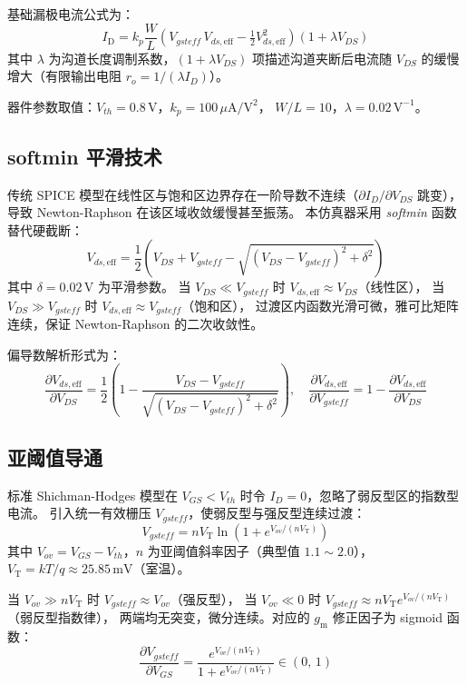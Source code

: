 \documentclass[12pt, a4paper]{article}
\newcommand{\id}{I_{\mathrm{D}}}
\newcommand{\gm}{g_{\mathrm{m}}}
\newcommand{\vT}{V_{\mathrm{T}}}
\begin{document}
基础漏极电流公式为：
\[
  \id = k_p \frac{W}{L}
        \left(V_{gsteff}\,V_{ds,\mathrm{eff}} - \tfrac{1}{2}V_{ds,\mathrm{eff}}^2\right)
        (1 + \lambda V_{DS})
\]
其中 $\lambda$ 为沟道长度调制系数，$(1+\lambda V_{DS})$ 项描述沟道夹断后电流随
$V_{DS}$ 的缓慢增大（有限输出电阻 $r_o = 1/(\lambda I_D)$）。

器件参数取值：$V_{th}=0.8\,\mathrm{V}$，$k_p=100\,\mu\mathrm{A/V^2}$，
$W/L=10$，$\lambda=0.02\,\mathrm{V^{-1}}$。

\subsection{softmin 平滑技术}
\label{sec:softmin}

传统 SPICE 模型在线性区与饱和区边界存在一阶导数不连续（$\partial I_D/\partial V_{DS}$ 跳变），
导致 Newton-Raphson 在该区域收敛缓慢甚至振荡。
本仿真器采用 \textit{softmin} 函数替代硬截断：
\[
  V_{ds,\mathrm{eff}} = \frac{1}{2}\!\left(
    V_{DS} + V_{gsteff}
    - \sqrt{(V_{DS} - V_{gsteff})^2 + \delta^2}
  \right)
\]
其中 $\delta=0.02\,\mathrm{V}$ 为平滑参数。
当 $V_{DS} \ll V_{gsteff}$ 时 $V_{ds,\mathrm{eff}}\approx V_{DS}$（线性区），
当 $V_{DS} \gg V_{gsteff}$ 时 $V_{ds,\mathrm{eff}}\approx V_{gsteff}$（饱和区），
过渡区内函数光滑可微，雅可比矩阵连续，保证 Newton-Raphson 的二次收敛性。

偏导数解析形式为：
\[
  \frac{\partial V_{ds,\mathrm{eff}}}{\partial V_{DS}} = \frac{1}{2}\!\left(
    1 - \frac{V_{DS}-V_{gsteff}}{\sqrt{(V_{DS}-V_{gsteff})^2+\delta^2}}
  \right),\quad
  \frac{\partial V_{ds,\mathrm{eff}}}{\partial V_{gsteff}} = 1 -
  \frac{\partial V_{ds,\mathrm{eff}}}{\partial V_{DS}}
\]

\subsection{亚阈值导通}
\label{sec:subthreshold}

标准 Shichman-Hodges 模型在 $V_{GS}<V_{th}$ 时令 $I_D=0$，忽略了弱反型区的指数型电流。
引入统一有效栅压 $V_{gsteff}$，使弱反型与强反型连续过渡：
\[
  V_{gsteff} = n \vT \ln\!\left(1 + e^{V_{ov}/(n\vT)}\right)
\]
其中 $V_{ov}=V_{GS}-V_{th}$，$n$ 为亚阈值斜率因子（典型值 $1.1\sim2.0$），
$\vT=kT/q\approx25.85\,\mathrm{mV}$（室温）。

当 $V_{ov}\gg n\vT$ 时 $V_{gsteff}\approx V_{ov}$（强反型），
当 $V_{ov}\ll0$ 时 $V_{gsteff}\approx n\vT e^{V_{ov}/(n\vT)}$（弱反型指数律），
两端均无突变，微分连续。对应的 $\gm$ 修正因子为 sigmoid 函数：
\[
  \frac{\partial V_{gsteff}}{\partial V_{GS}} = \frac{e^{V_{ov}/(n\vT)}}{1+e^{V_{ov}/(n\vT)}}
  \in (0,\,1)
\]
\end{document}
